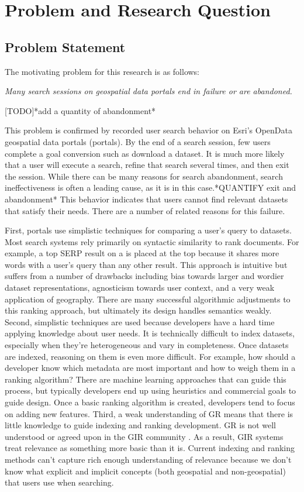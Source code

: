 \chapter{Problem and Research Question} \label{ch:[chapter 3 label]}

\section{Problem Statement}

The motivating problem for this research is as follows:
\linebreak

\emph{Many search sessions on geospatial data portals end in failure or are abandoned.}
\linebreak

[TODO]*add a quantity of abandonment*

This problem is confirmed by recorded user search behavior on Esri's OpenData geospatial data portals (portals). By the end of a search session, few users complete a goal conversion  such as download a dataset. It is much more likely that a user will execute a search, refine that search several times, and then exit the session. While there can be many reasons for search abandonment, search ineffectiveness is often a leading cause, as it is in this case.*QUANTIFY exit and abandonment* This behavior indicates that users cannot find relevant datasets that satisfy their needs. There are a number of related reasons for this failure.

First, portals use simplistic techniques for comparing a user's query to datasets. Most search systems rely primarily on syntactic similarity to rank documents. For example, a top SERP result on a is placed at the top because it shares more words with a user's query than any other result. This approach is intuitive but suffers from a number of drawbacks including bias towards larger and wordier dataset representations, agnosticism towards user context, and a very weak application of geography. There are many successful algorithmic adjustments to this ranking approach, but ultimately its design handles semantics weakly. Second, simplistic techniques are used because developers have a hard time applying knowledge about user needs. It is technically difficult to index datasets, especially when they're heterogeneous and vary in completeness. Once datasets are indexed, reasoning on them is even more difficult. For example, how should a developer know which metadata are most important and how to weigh them in a ranking algorithm? There are machine learning approaches that can guide this process, but typically developers end up using heuristics and commercial goals to guide design. Once a basic ranking algorithm is created, developers tend to focus on adding new features. Third, a weak understanding of GR means that there is little knowledge to guide indexing and ranking development. GR is not well understood or agreed upon in the GIR community \cite{Purves2018}. As a result, GIR systems treat relevance as something more basic than it is. Current indexing and ranking methods can't capture rich enough understanding of relevance because we don't know what explicit and implicit concepts (both geospatial and non-geospatial) that users use when searching.

